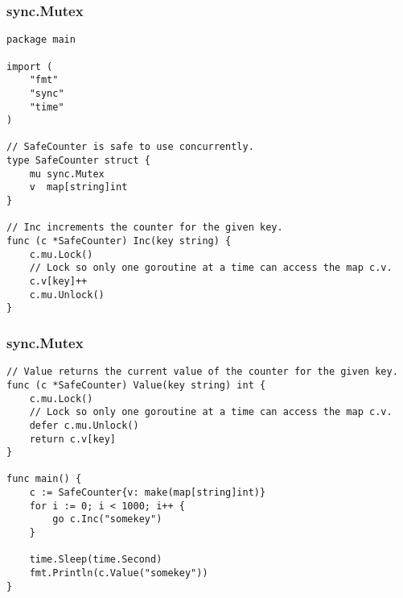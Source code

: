 \begin{frame}[fragile]
\frametitle{sync.Mutex}

\begin{lstlisting}
package main

import (
    "fmt"
    "sync"
    "time"
)

// SafeCounter is safe to use concurrently.
type SafeCounter struct {
    mu sync.Mutex
    v  map[string]int
}

// Inc increments the counter for the given key.
func (c *SafeCounter) Inc(key string) {
    c.mu.Lock()
    // Lock so only one goroutine at a time can access the map c.v.
    c.v[key]++
    c.mu.Unlock()
}
\end{lstlisting}
\end{frame}


\begin{frame}[fragile]
\frametitle{sync.Mutex}

\begin{lstlisting}
// Value returns the current value of the counter for the given key.
func (c *SafeCounter) Value(key string) int {
    c.mu.Lock()
    // Lock so only one goroutine at a time can access the map c.v.
    defer c.mu.Unlock()
    return c.v[key]
}

func main() {
    c := SafeCounter{v: make(map[string]int)}
    for i := 0; i < 1000; i++ {
        go c.Inc("somekey")
    }

    time.Sleep(time.Second)
    fmt.Println(c.Value("somekey"))
}
\end{lstlisting}
\end{frame}